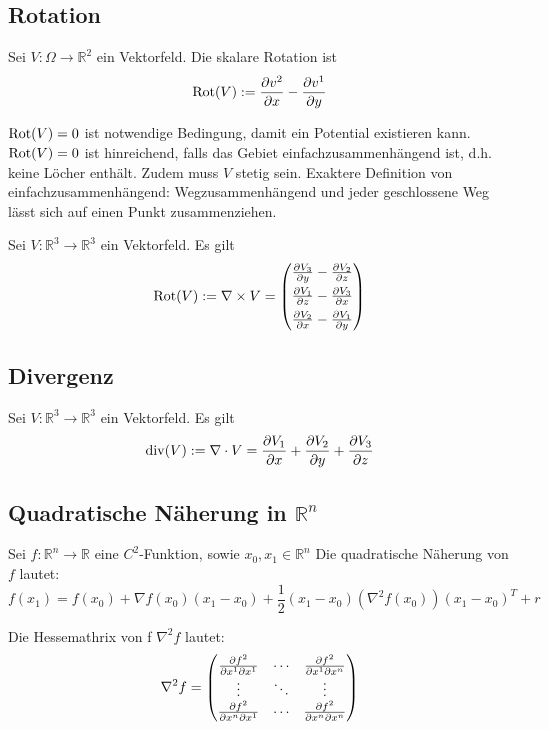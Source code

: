 	\subsection{Rotation}
		\begin{definition}
			Sei $V : \Omega \to \mathbb{R}^2$ ein Vektorfeld. Die skalare Rotation ist 
			$$ \Rot(V) := \pdiff{v^2}{x} - \pdiff{v^1}{y} $$ 
		\end{definition}			
		\begin{proofhelp}
			$\operatorname{Rot}(V) = 0$ ist notwendige Bedingung, damit ein Potential existieren kann.
			$\operatorname{Rot}(V) = 0$ ist hinreichend, falls das Gebiet einfachzusammenhängend ist, d.h. keine Löcher enthält. Zudem muss $V$ stetig sein. Exaktere Definition von einfachzusammenhängend: Wegzusammenhängend und jeder geschlossene Weg lässt sich auf einen Punkt zusammenziehen.
		\end{proofhelp}
		\begin{definition}
			Sei $V : \mathbb{R}^3 \to \mathbb{R}^3$ ein Vektorfeld. Es gilt
			$$ \Rot(V) := \nabla \times V = 
			\begin{pmatrix}
				\pdiff{V_3}{y}-\pdiff{V_2}{z} \\[1ex]
				\pdiff{V_1}{z}-\pdiff{V_3}{x} \\[1ex]
				\pdiff{V_2}{x}-\pdiff{V_1}{y} 
			\end{pmatrix}			 $$ 
		\end{definition}	
	\subsection{Divergenz}
		\begin{definition}
			Sei $V : \mathbb{R}^3 \to \mathbb{R}^3$ ein Vektorfeld. Es gilt
			$$ \div(V) := \nabla \cdot V = \pdiff{V_1}{x} + \pdiff{V_2}{y} + \pdiff{V_3}{z} $$ 
		\end{definition}	
	\subsection{Quadratische Näherung in $\mathbb{R}^n$}
		\begin{proofhelp}
			Sei $f: \mathbb{R}^n \to \mathbb{R}$ eine $C^2$-Funktion, sowie $x_0,x_1 \in \mathbb{R}^n$
			Die quadratische Näherung von $f$ lautet:
			$$
				f(x_1) = f(x_0) + \nabla f(x_0) (x_1 - x_0) + \frac{1}{2}(x_1 - x_0)(\nabla^2f(x_0))(x_1 -x_0)^T + r
			$$
		\end{proofhelp}
		\begin{proofhelp}[Hessematrix]
			Die Hessemathrix von f $\nabla^2f$ lautet:
			$$ 
			\nabla^2f = 
			\begin{pmatrix}
			\pdiff{f^2}{x^1\partial x^1} 	& \cdots & \pdiff{f^2}{x^1\partial x^n} \\
			\vdots							& \ddots & \vdots						\\
			\pdiff{f^2}{x^n\partial x^1} 	& \cdots & \pdiff{f^2}{x^n\partial x^n} \\
			\end{pmatrix}
			$$
		\end{proofhelp}
